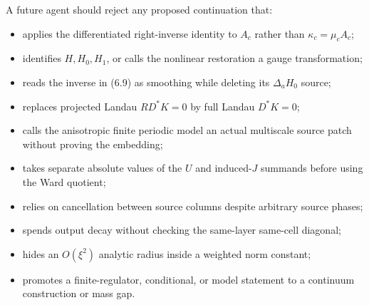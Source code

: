 \documentclass[11pt]{article}
\theoremstyle{definition}
\begin{document}
A future agent should reject any proposed continuation that:
\begin{itemize}
  \item applies the differentiated right-inverse identity to \(A_c\) rather
  than \(\kappa_c=\mu_cA_c\);
  \item identifies \(H,H_0,H_1\), or calls the nonlinear restoration a gauge
  transformation;
  \item reads the inverse in (6.9) as smoothing while deleting its
  \(\Delta_aH_0\) source;
  \item replaces projected Landau \(RD^*K=0\) by full Landau \(D^*K=0\);
  \item calls the anisotropic finite periodic model an actual multiscale
  source patch without proving the embedding;
  \item takes separate absolute values of the \(U\) and induced-\(J\)
  summands before using the Ward quotient;
  \item relies on cancellation between source columns despite arbitrary
  source phases;
  \item spends output decay without checking the same-layer same-cell
  diagonal;
  \item hides an \(O(\xi^2)\) analytic radius inside a weighted norm constant;
  \item promotes a finite-regulator, conditional, or model statement to a
  continuum construction or mass gap.
\end{itemize}
\end{document}

